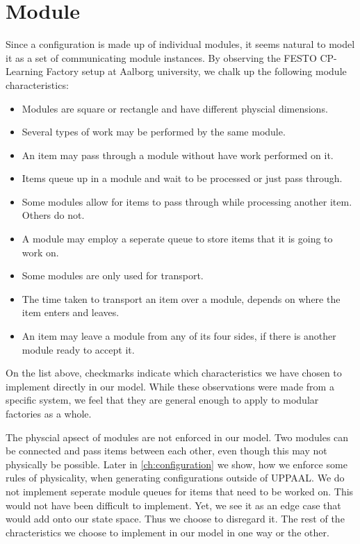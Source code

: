 \section{Module}
\label{subs:module}
Since a configuration is made up of individual modules, it seems natural to model it as a set of communicating module instances. By observing the FESTO CP-Learning Factory setup at Aalborg university, we chalk up the following  module characteristics:

\begin{itemize}
\item Modules are square or rectangle and have different physcial dimensions.
\item Several types of work may be performed by the same module. \checkmark
\item An item may pass through a module without have work performed on it. \checkmark
\item Items queue up in a module and wait to be processed or just pass through. \checkmark
\item Some modules allow for items to pass through while processing another item. Others do not. \checkmark
\item A module may employ a seperate queue to store items that it is going to work on. 
\item Some modules are only used for transport. \checkmark
\item The time taken to transport an item over a module, depends on where the item enters and leaves. \checkmark
\item An item may leave a module from any of its four sides, if there is another module ready to accept it. \checkmark
\end{itemize} 

On the list above, checkmarks indicate which characteristics we have chosen to implement directly in our model. While these observations were made from a specific system, we feel that they are general enough to apply to modular factories as a whole. 

The physcial apsect of  modules are not enforced in our model. Two modules can be connected and pass items between each other, even though this may not physically be possible. Later in \cref{ch:configuration} we show, how we enforce some rules of physicality, when generating configurations outside of UPPAAL. We do not implement seperate module queues for items that need to be worked on. This would not have been difficult to implement. Yet, we see it as an edge case that would add onto our state space. Thus we choose to disregard it. The rest of the chracteristics we choose to implement in our model in one way or the other.

